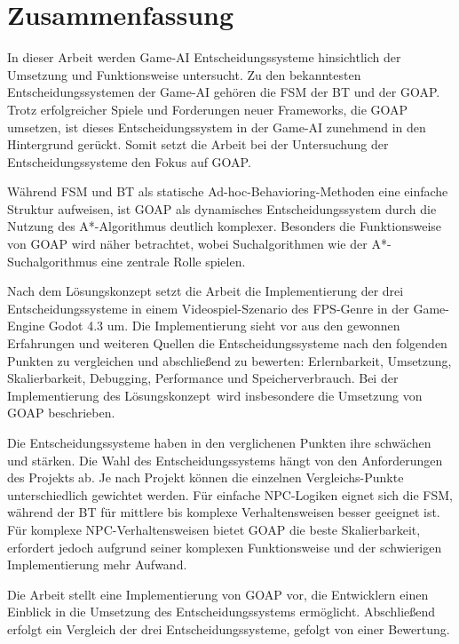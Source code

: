 \chapter{Zusammenfassung}
\label{chap:zusammenfassung}

In dieser Arbeit werden Game-AI Entscheidungssysteme hinsichtlich der Umsetzung und Funktionsweise untersucht. Zu den bekanntesten Entscheidungssystemen der Game-AI geh\"{o}ren die FSM der BT und der GOAP. Trotz erfolgreicher Spiele und Forderungen neuer Frameworks, die GOAP umsetzen, ist dieses Entscheidungssystem in der Game-AI zunehmend in den Hintergrund ger\"{u}ckt. Somit setzt die Arbeit bei der Untersuchung der Entscheidungssysteme den Fokus auf GOAP.

W\"{a}hrend FSM und BT als statische Ad-hoc-Behavioring-Methoden eine einfache Struktur aufweisen, ist GOAP als dynamisches Entscheidungssystem durch die Nutzung des A*-Algorithmus deutlich komplexer. Besonders die Funktionsweise von GOAP wird n\"{a}her betrachtet, wobei Suchalgorithmen wie der A*-Suchalgorithmus eine zentrale Rolle spielen.

Nach dem L\"{o}sungskonzept setzt die Arbeit die Implementierung der drei Entscheidungssysteme in einem Videospiel-Szenario des FPS-Genre in der Game-Engine Godot 4.3 um. Die Implementierung sieht vor aus den gewonnen Erfahrungen und weiteren Quellen die Entscheidungssysteme nach den folgenden Punkten zu vergleichen und abschlie\ss{}end zu bewerten: Erlernbarkeit, Umsetzung, Skalierbarkeit, Debugging, Performance und Speicherverbrauch. Bei der Implementierung des L\"{o}sungskonzept\ wird insbesondere die Umsetzung von GOAP beschrieben.

Die Entscheidungssysteme haben in den verglichenen Punkten ihre schw\"{a}chen und st\"{a}rken. Die Wahl des Entscheidungssystems h\"{a}ngt von den Anforderungen des Projekts ab. Je nach Projekt k\"{o}nnen die einzelnen Vergleichs-Punkte unterschiedlich gewichtet werden. F\"{u}r einfache NPC-Logiken eignet sich die FSM, w\"{a}hrend der BT f\"{u}r mittlere bis komplexe Verhaltensweisen besser geeignet ist. F\"{u}r komplexe NPC-Verhaltensweisen bietet GOAP die beste Skalierbarkeit, erfordert jedoch aufgrund seiner komplexen Funktionsweise und der schwierigen Implementierung mehr Aufwand.

Die Arbeit stellt eine Implementierung von GOAP vor, die Entwicklern einen Einblick in die Umsetzung des Entscheidungssystems erm\"{o}glicht. Abschlie\ss{}end erfolgt ein Vergleich der drei Entscheidungssysteme, gefolgt von einer Bewertung.